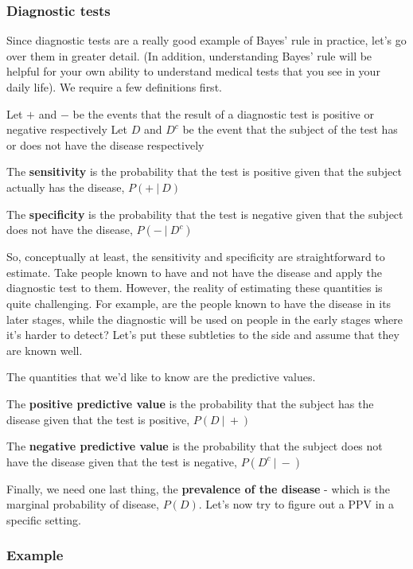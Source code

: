 \documentclass[]{article}
\begin{document}
\subsubsection{Diagnostic tests}\label{diagnostic-tests}

Since diagnostic tests are a really good example of Bayes' rule in
practice, let's go over them in greater detail. (In addition,
understanding Bayes' rule will be helpful for your own ability to
understand medical tests that you see in your daily life). We require a
few definitions first.

Let $+$ and $-$ be the events that the result of a diagnostic test is
positive or negative respectively Let $D$ and $D^c$ be the event that
the subject of the test has or does not have the disease respectively

The \textbf{sensitivity} is the probability that the test is positive
given that the subject actually has the disease, $P(+ ~|~ D)$

The \textbf{specificity} is the probability that the test is negative
given that the subject does not have the disease, $P(- ~|~ D^c)$

So, conceptually at least, the sensitivity and specificity are
straightforward to estimate. Take people known to have and not have the
disease and apply the diagnostic test to them. However, the reality of
estimating these quantities is quite challenging. For example, are the
people known to have the disease in its later stages, while the
diagnostic will be used on people in the early stages where it's harder
to detect? Let's put these subtleties to the side and assume that they
are known well.

The quantities that we'd like to know are the predictive values.

The \textbf{positive predictive value} is the probability that the
subject has the disease given that the test is positive, $P(D ~|~ +)$

The \textbf{negative predictive value} is the probability that the
subject does not have the disease given that the test is negative,
$P(D^c ~|~ -)$

Finally, we need one last thing, the \textbf{prevalence of the disease}
- which is the marginal probability of disease, $P(D)$. Let's now try to
figure out a PPV in a specific setting.

\subsubsection{Example}\label{example-5}
\end{document}
